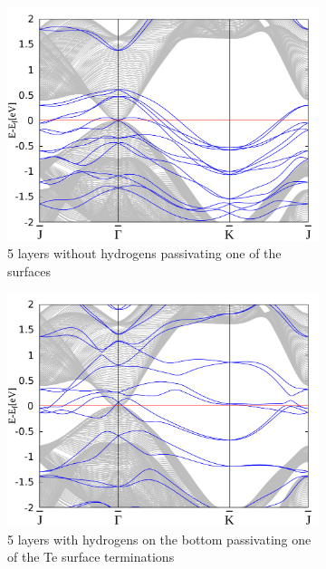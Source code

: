 	\begin{figure}[htbp]
		\begin{subfigure}[c]{.48\linewidth}
			\centering
			\includegraphics[width=\linewidth]{Te_termination/no_H_bulk+5_layers_no_dos_-2_2.pdf}
			\caption{5 layers without hydrogens passivating one of the surfaces}
		\end{subfigure}
		\hfill
		\begin{subfigure}[c]{.48\linewidth}
			\centering
			\includegraphics[width=\linewidth]{Te_termination/bulk+5_layers_no_dos_-2_2.pdf}
			\caption{5 layers with hydrogens on the bottom passivating one of the Te surface terminations}
		\end{subfigure}
		\begin{subfigure}[c]{.48\linewidth}

\end{subfigure}
\end{figure}
